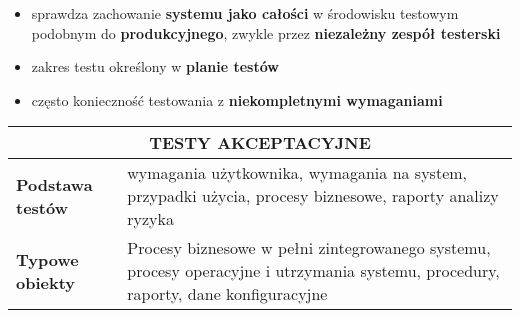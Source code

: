\documentclass[main.tex]{subfiles}
\begin{document}
    \begin{itemize}[noitemsep]
        \item sprawdza zachowanie \textbf{systemu jako całości} w środowisku testowym podobnym do \textbf{produkcyjnego},
        zwykle przez \textbf{niezależny zespół testerski}
        \item zakres testu określony w \textbf{planie testów}
        \item często konieczność testowania z \textbf{niekompletnymi wymaganiami}
    \end{itemize}


    \begin{table}[H]
        \begin{center}
            \begin{tabular}{| p{4cm}| p{12cm}|}
                \hline
                \multicolumn{2}{|c|}{ \textbf{TESTY AKCEPTACYJNE}}\\
                \hline
                \textbf{Podstawa testów} & wymagania użytkownika, wymagania na system,
                przypadki użycia, procesy biznesowe, raporty
                analizy ryzyka\\
                \hline
                \textbf{Typowe obiekty} & Procesy biznesowe w pełni zintegrowanego
                systemu, procesy operacyjne i utrzymania systemu,
                procedury, raporty, dane konfiguracyjne\\
                \hline
            \end{tabular}
        \end{center}
    \end{table}
\end{document}
